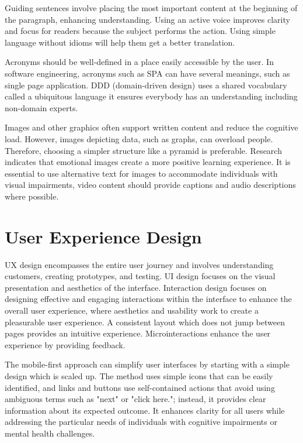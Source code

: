\documentclass{article}
\begin{document}
Guiding sentences involve placing the most important content at the beginning of the paragraph, enhancing understanding. Using an active voice improves clarity and focus for readers because the subject performs the action. Using simple language without idioms will help them get a better translation. 

Acronyms should be well-defined in a place easily accessible by the user. In software engineering, acronyms such as SPA can have several meanings, such as single page application. DDD (domain-driven design) uses a shared vocabulary called a ubiquitous language it ensures everybody has an understanding including non-domain experts.

Images and other graphics often support written content and reduce the cognitive load. However, images depicting data, such as graphs, can overload people. Therefore, choosing a simpler structure like a pyramid is preferable. Research indicates that emotional images create a more positive learning experience. It is essential to use alternative text for images to accommodate individuals with visual impairments, video content should provide captions and audio descriptions where possible.


\section{User Experience Design}

 UX design encompasses the entire user journey and involves understanding customers, creating prototypes, and testing. UI design focuses on the visual presentation and aesthetics of the interface. Interaction design focuses on designing effective and engaging interactions within the interface to enhance the overall user experience, where aesthetics and usability work to create a pleasurable user experience. A consistent layout which does not jump between pages provides an intuitive experience. Microinteractions enhance the user experience by providing feedback. 

The mobile-first approach can simplify user interfaces by starting with a simple design which is scaled up. The method uses simple icons that can be easily identified, and links and buttons use self-contained actions that avoid using ambiguous terms such as "next" or "click here."; instead, it provides clear information about its expected outcome. It enhances clarity for all users while addressing the particular needs of individuals with cognitive impairments or mental health challenges.  
\end{document}
